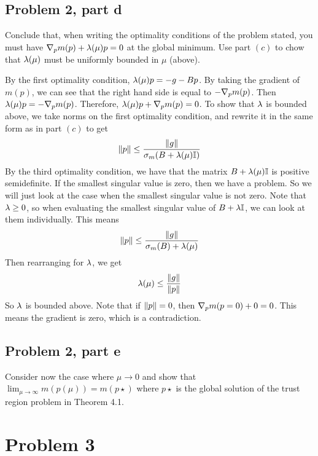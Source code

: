 \subsection{Problem 2, part d}
Conclude that, when writing the optimality conditions of the problem stated, you must have $\nabla_p m(p) + \mathrm{\lambda}(\mu)p = 0$ at the global minimum. Use part $(c)$ to chow that $\mathrm{\lambda}(\mu)$ must be uniformly bounded in $\mu$ (above).
\partbreak
\begin{solution}

    By the first optimality condition, $\mathrm{\lambda}(\mu)p = -g - Bp$. By taking the gradient of $m(p)$, we can see that the right hand side is equal to $-\nabla_p m(p)$. Then $\mathrm{\lambda}(\mu)p = -\nabla_p m(p)$. Therefore, $\mathrm{\lambda}(\mu)p + \nabla_p m(p)= 0$. To show that $\mathrm{\lambda}$ is bounded above, we take norms on the first optimality condition, and rewrite it in the same form as in part $(c)$ to get
    \[\norm{p} \leq \frac{\norm{g}}{\sigma_{m}(B + \mathrm{\lambda}(\mu)\mathbb{I} )}\]
    By the third optimality condition, we have that the matrix $B + \mathrm{\lambda}(\mu)\mathbb{I}$ is positive semidefinite. If the smallest singular value is zero, then we have a problem. So we will just look at the case when the smallest singular value is not zero. Note that $\mathrm{\lambda} \geq 0$, so when evaluating the smallest singular value of $B + \mathrm{\lambda} \mathbb{I}$, we can look at them individually. This means
    \[\norm{p} \leq \frac{\norm{g}}{\sigma_{m}(B) + \mathrm{\lambda}(\mu) }\]
    Then rearranging for $\mathrm{\lambda}$, we get
    \[\mathrm{\lambda}(\mu) \leq \frac{\norm{g}}{\norm{p}}\]
    So $\mathrm{\lambda}$ is bounded above. Note that if $\norm{p} = 0$, then $\nabla_p m(p = 0) + 0 = 0$. This means the gradient is zero, which is a contradiction.
\end{solution}

\newpage
\subsection{Problem 2, part e}
Consider now the case where $\mu \rightarrow 0$ and show that $\lim_{\mu \rightarrow \infty} m(p(\mu)) = m(p\star)$ where $p\star$ is the global solution of the trust region problem in Theorem 4.1. 
\partbreak
\begin{solution}

\end{solution}

\newpage
\section{Problem 3}
